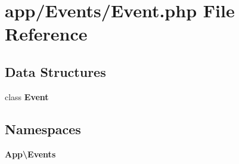 \section{app/\+Events/\+Event.php File Reference}
\label{app_2_events_2_event_8php}
\subsection*{Data Structures}
\begin{DoxyCompactItemize}
\item 
class {\bf Event}
\end{DoxyCompactItemize}
\subsection*{Namespaces}
\begin{DoxyCompactItemize}
\item 
 {\bf App\textbackslash{}\+Events}
\end{DoxyCompactItemize}
